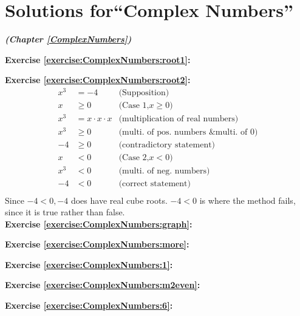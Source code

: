 \section{Solutions for``Complex Numbers''}
\label{sec:AnswerKey:ComplexNumbers}
\noindent\textbf{\textit{ (Chapter \ref{ComplexNumbers})}}\bigskip

\noindent\textbf{Exercise \ref{exercise:ComplexNumbers:root1}:}

\noindent\textbf{Exercise \ref{exercise:ComplexNumbers:root2}:} %
\begin{align*}
x^{3} &= -4		&\text{(Supposition)}\\
x &\geq 0		&\text{(Case 1,} x \geq 0)\\
x^{3} &= x \cdot x \cdot x 		&\text{(multiplication of real numbers)}\\
x^{3} &\geq 0		&\text{(multi. of pos. numbers \& multi. of 0)}\\
-4 &\geq 0		&\text{(contradictory statement)}\\
x &< 0		&\text{(Case 2,} x < 0)\\
x^{3} &< 0		&\text{(multi. of neg. numbers)}\\
-4 &< 0		&\text{(correct statement)}\\
\end{align*}
Since $-4 < 0, -4$ does have real cube roots. $-4 < 0$ is where the method fails, since it is true rather than false.\\

\noindent\textbf{Exercise \ref{exercise:ComplexNumbers:graph}:}

\noindent\textbf{Exercise \ref{exercise:ComplexNumbers:more}:}

\noindent\textbf{Exercise \ref{exercise:ComplexNumbers:1}:}

\noindent\textbf{Exercise \ref{exercise:ComplexNumbers:m2even}:}

\noindent\textbf{Exercise \ref{exercise:ComplexNumbers:6}:}

